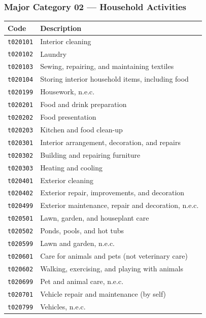 \documentclass[11pt, a4paper]{article}
\begin{document}
\subsubsection*{Major Category 02 --- Household Activities}
\begin{longtable}{L{3cm} L{13cm}}
\toprule \textbf{Code} & \textbf{Description} \\ \midrule \endhead
\bottomrule \endfoot
\texttt{t020101} & Interior cleaning \\
 \texttt{t020102} & Laundry \\
\texttt{t020103} & Sewing, repairing, and maintaining textiles \\
 \texttt{t020104} & Storing interior household items, including food \\
\texttt{t020199} & Housework, n.e.c. \\
 \texttt{t020201} & Food and drink preparation \\
\texttt{t020202} & Food presentation \\
 \texttt{t020203} & Kitchen and food clean-up \\
\texttt{t020301} & Interior arrangement, decoration, and repairs \\
 \texttt{t020302} & Building and repairing furniture \\
\texttt{t020303} & Heating and cooling \\
 \texttt{t020401} & Exterior cleaning \\
\texttt{t020402} & Exterior repair, improvements, and decoration \\
 \texttt{t020499} & Exterior maintenance, repair and decoration, n.e.c. \\
\texttt{t020501} & Lawn, garden, and houseplant care \\
 \texttt{t020502} & Ponds, pools, and hot tubs \\
\texttt{t020599} & Lawn and garden, n.e.c. \\
 \texttt{t020601} & Care for animals and pets (not veterinary care) \\
\texttt{t020602} & Walking, exercising, and playing with animals \\
 \texttt{t020699} & Pet and animal care, n.e.c. \\
\texttt{t020701} & Vehicle repair and maintenance (by self) \\
 \texttt{t020799} & Vehicles, n.e.c. \\

\end{longtable}
\end{document}
